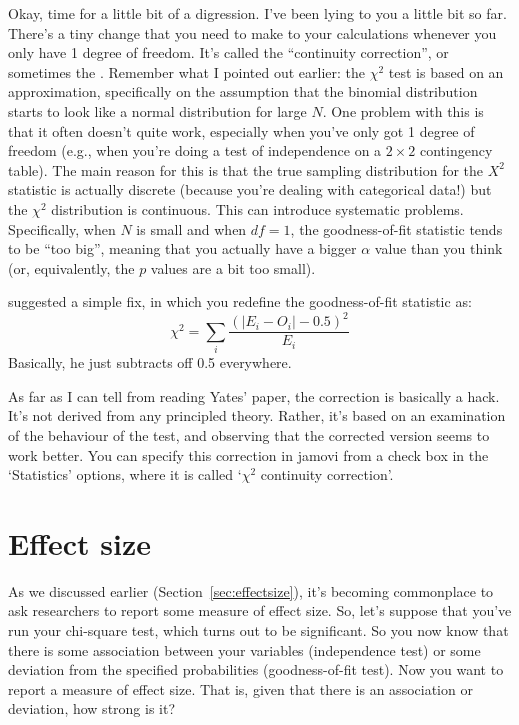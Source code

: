 Okay, time for a little bit of a digression. I've been lying to you a little bit so far. There's a tiny change that you need to make to your calculations whenever you only have 1 degree of freedom. It's called the ``continuity correction'', or sometimes the . Remember what I pointed out earlier: the $\chi^2$ test is based on an approximation, specifically on the assumption that the binomial distribution starts to look like a normal distribution for large $N$. One problem with this is that it often doesn't quite work, especially when you've only got 1 degree of freedom (e.g., when you're doing a test of independence on a $2 \times 2$ contingency table). The main reason for this is that the true sampling distribution for the $X^2$ statistic is actually discrete (because you're dealing with categorical data!) but the $\chi^2$ distribution is continuous. This can introduce systematic problems. Specifically, when $N$ is small and when $df=1$, the goodness-of-fit statistic tends to be ``too big'', meaning that you actually have a bigger $\alpha$ value than you think (or, equivalently, the $p$ values are a bit too small). 

\vspace{0.5cm}
\begin{mdframed}[style=MyFrame,nobreak=true]
\textcite{Yates1934} suggested a simple fix, in which you redefine the goodness-of-fit statistic as:
$$
\chi^2 = \sum_{i} \frac{(|E_i - O_i| - 0.5)^2}{E_i}
$$
Basically, he just subtracts off 0.5 everywhere. 
\end{mdframed}

As far as I can tell from reading Yates' paper, the correction is basically a hack. It's not derived from any principled theory. Rather, it's based on an examination of the behaviour of the test, and observing that the corrected version seems to work better. You can specify this correction in jamovi from a check box in the `Statistics' options, where it is called `$\chi^2$ continuity correction'. 


\section{Effect size~\label{sec:chisqeffectsize}}

As we discussed earlier (Section~\ref{sec:effectsize}), it's becoming commonplace to ask researchers to report some measure of effect size. So, let's suppose that you've run your chi-square test, which turns out to be significant. So you now know that there is some association between your variables (independence test) or some deviation from the specified probabilities (goodness-of-fit test). Now you want to report a measure of effect size. That is, given that there is an association or deviation, how strong is it?

